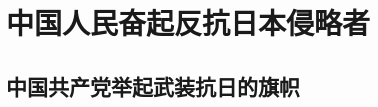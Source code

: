 \documentclass[10pt, UTF8]{book} %
\begin{document}
\section{中国人民奋起反抗日本侵略者}

\subsection{中国共产党举起武装抗日的旗帜}








\end{document}
